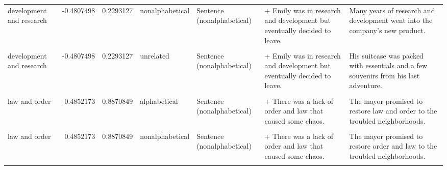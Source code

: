 \documentclass[
  12pt,
]{scrartcl}
\begin{document}
\begin{landscape}
\begin{longtable}{lrrllll}
development and research & -0.4807498 & 0.2293127 & nonalphabetical & Sentence (nonalphabetical) & + Emily was in research and development but eventually decided to leave. & Many years of research and development went into the company's new product.\\
\addlinespace
\cellcolor{gray!6}{development and research} & \cellcolor{gray!6}{-0.4807498} & \cellcolor{gray!6}{0.2293127} & \cellcolor{gray!6}{unrelated} & \cellcolor{gray!6}{Sentence (alphabetical)} & \cellcolor{gray!6}{+ Emily was in development and research but eventually decided to leave.} & \cellcolor{gray!6}{His suitcase was packed with essentials and a few souvenirs from his last adventure.}\\
development and research & -0.4807498 & 0.2293127 & unrelated & Sentence (nonalphabetical) & + Emily was in research and development but eventually decided to leave. & His suitcase was packed with essentials and a few souvenirs from his last adventure.\\
\cellcolor{gray!6}{law and order} & \cellcolor{gray!6}{0.4852173} & \cellcolor{gray!6}{0.8870849} & \cellcolor{gray!6}{alphabetical} & \cellcolor{gray!6}{Sentence (alphabetical)} & \cellcolor{gray!6}{+ There was a lack of law and order that caused some chaos.} & \cellcolor{gray!6}{The mayor promised to restore law and order to the troubled neighborhoods.}\\
law and order & 0.4852173 & 0.8870849 & alphabetical & Sentence (nonalphabetical) & + There was a lack of order and law that caused some chaos. & The mayor promised to restore law and order to the troubled neighborhoods.\\
\cellcolor{gray!6}{law and order} & \cellcolor{gray!6}{0.4852173} & \cellcolor{gray!6}{0.8870849} & \cellcolor{gray!6}{nonalphabetical} & \cellcolor{gray!6}{Sentence (alphabetical)} & \cellcolor{gray!6}{+ There was a lack of law and order that caused some chaos.} & \cellcolor{gray!6}{The mayor promised to restore order and law to the troubled neighborhoods.}\\
\addlinespace
law and order & 0.4852173 & 0.8870849 & nonalphabetical & Sentence (nonalphabetical) & + There was a lack of order and law that caused some chaos. & The mayor promised to restore order and law to the troubled neighborhoods.\\
\cellcolor{gray!6}{law and order} & \cellcolor{gray!6}{0.4852173} & \cellcolor{gray!6}{0.8870849} & \cellcolor{gray!6}{unrelated} & \cellcolor{gray!6}{Sentence (alphabetical)} & \cellcolor{gray!6}{+ There was a lack of law and order that caused some chaos.} & \cellcolor{gray!6}{She took a long walk through the city, marveling at the towering skyscrapers.}\\

\end{longtable}
\end{landscape}
\end{document}
